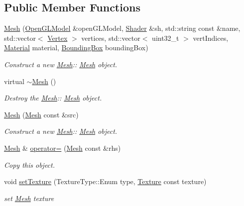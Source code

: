 \subsection*{Public Member Functions}
\begin{DoxyCompactItemize}
\item 
\hyperlink{class_mesh_a3acd2a5dec9fade334a7c37cf46a9962}{Mesh} (\hyperlink{class_open_g_l_model}{Open\+G\+L\+Model} \&open\+G\+L\+Model, \hyperlink{class_shader}{Shader} \&sh, std\+::string const \&name, std\+::vector$<$ \hyperlink{struct_vertex}{Vertex} $>$ vertices, std\+::vector$<$ uint32\+\_\+t $>$ vert\+Indices, \hyperlink{class_material}{Material} material, \hyperlink{struct_bounding_box}{Bounding\+Box} bounding\+Box)
\begin{DoxyCompactList}\small\item\em Construct a new \hyperlink{class_mesh}{Mesh}\+:\+: \hyperlink{class_mesh}{Mesh} object. \end{DoxyCompactList}\item 
\mbox{\label{class_mesh_a5efe4da1a4c0971cfb037bd70304c303}} 
virtual \hyperlink{class_mesh_a5efe4da1a4c0971cfb037bd70304c303}{$\sim$\+Mesh} ()
\begin{DoxyCompactList}\small\item\em Destroy the \hyperlink{class_mesh}{Mesh}\+:\+: \hyperlink{class_mesh}{Mesh} object. \end{DoxyCompactList}\item 
\hyperlink{class_mesh_aa61b77f723d39c1bdaf4ed24ab8dae2c}{Mesh} (\hyperlink{class_mesh}{Mesh} const \&src)
\begin{DoxyCompactList}\small\item\em Construct a new \hyperlink{class_mesh}{Mesh}\+:\+: \hyperlink{class_mesh}{Mesh} object. \end{DoxyCompactList}\item 
\hyperlink{class_mesh}{Mesh} \& \hyperlink{class_mesh_aab3228b39ec8cc452c93eeaf0f4e00c6}{operator=} (\hyperlink{class_mesh}{Mesh} const \&rhs)
\begin{DoxyCompactList}\small\item\em Copy this object. \end{DoxyCompactList}\item 
void \hyperlink{class_mesh_af8d667c581d9082760b2bb77cc686aed}{set\+Texture} (Texture\+Type\+::\+Enum type, \hyperlink{struct_texture}{Texture} const texture)
\begin{DoxyCompactList}\small\item\em set \hyperlink{class_mesh}{Mesh} texture \end{DoxyCompactList}\item 

\end{DoxyCompactItemize}
